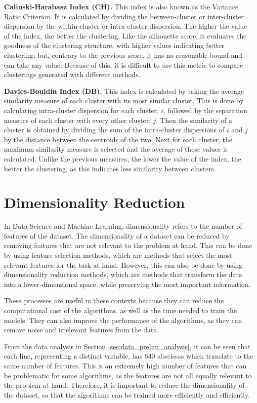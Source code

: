 \noindent\textbf{Calinski-Harabasz Index (CH).} This index is also known as the Variance Ratio Criterion. It is calculated by dividing the between-cluster or inter-cluster dispersion by the within-cluster or intra-cluster dispersion. The higher the value of the index, the better the clustering. Like the silhouette score, it evaluates the goodness of the clustering structure, with higher values indicating better clustering; but, contrary to the previous score, it has no reasonable bound and can take any value. Because of this, it is difficult to use this metric to compare clusterings generated with different methods.

\noindent\textbf{Davies-Bouldin Index (DB).} This index is calculated by taking the average similarity measure of each cluster with its most similar cluster. This is done by calculating intra-cluster dispersion for each cluster, $i$, followed by the separation measure of each cluster with every other cluster, $j$. Then the similarity of a cluster is obtained by dividing the sum of the intra-cluster dispersions of $i$ and $j$ by the distance between the centroids of the two. Next for each cluster, the maximum similarity measure is selected and the average of these values is calculated. Unlike the previous measures, the lower the value of the index, the better the clustering, as this indicates less similarity between clusters.

\section{Dimensionality Reduction}\label{sec:dim_reduction}
In Data Science and Machine Learning, dimensionality refers to the number of features of the dataset. The dimensionality of a dataset can be reduced by removing features that are not relevant to the problem at hand. This can be done by using feature selection methods, which are methods that select the most relevant features for the task at hand. However, this can also be done by using dimensionality reduction methods, which are methods that transform the data into a lower-dimensional space, while preserving the most important information.

These processes are useful in these contexts because they can reduce the computational cost of the algorithms, as well as the time needed to train the models. They can also improve the performance of the algorithms, as they can remove noise and irrelevant features from the data.

From the data analysis in Section \ref{sec:data_prelim_analysis}, it can be seen that each line, representing a distinct variable, has 640 abscissas which translate to the same number of features. This is an extremely high number of features that can be problematic for some algorithms, as the features are not all equally relevant to the problem at hand. Therefore, it is important to reduce the dimensionality of the dataset, so that the algorithms can be trained more efficiently and efficiently. 

